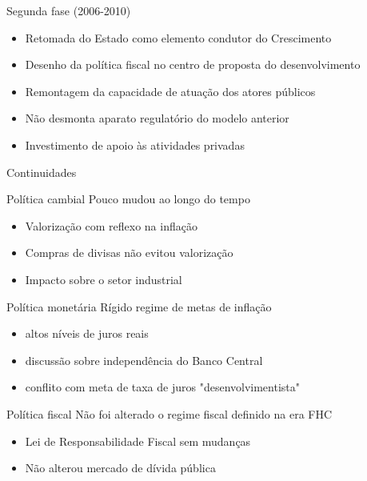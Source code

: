 \documentclass[presentation]{beamer}
\begin{document}
\begin{frame}[label={sec:orge730534}]{Segunda fase (2006-2010)}
\begin{itemize}
\item Retomada do Estado como elemento condutor do Crescimento
\item Desenho da política fiscal no centro de proposta do desenvolvimento
\item Remontagem da capacidade de atuação dos atores públicos
\item Não desmonta aparato regulatório do modelo anterior
\item Investimento de apoio às atividades privadas
\end{itemize}
\end{frame}

\begin{frame}[label={sec:org133531b}]{Continuidades}
\begin{block}{Política cambial}
Pouco mudou ao longo do tempo

\begin{itemize}
\item Valorização com reflexo na inflação
\item Compras de divisas não evitou valorização
\item Impacto sobre o setor industrial
\end{itemize}
\end{block}

\begin{block}{Política monetária}
Rígido regime de metas de inflação

\begin{itemize}
\item altos níveis de juros reais
\item discussão sobre independência do Banco Central
\item conflito com meta de taxa de juros "desenvolvimentista"
\end{itemize}
\end{block}

\begin{block}{Política fiscal}
Não foi alterado o regime fiscal definido na era FHC

\begin{itemize}
\item Lei de Responsabilidade Fiscal sem mudanças
\item Não alterou mercado de dívida pública
\end{itemize}
\end{block}
\end{frame}
\end{document}
